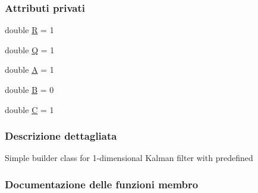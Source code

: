 \subsubsection*{Attributi privati}
\begin{DoxyCompactItemize}
\item 
double \hyperlink{classit_1_1unibo_1_1torsello_1_1bluetoothpositioning_1_1kalmanFilter_1_1KFBuilder_a7937e1ec71fbede97b0bd70ead2e30dd_a7937e1ec71fbede97b0bd70ead2e30dd}{R} = 1
\item 
double \hyperlink{classit_1_1unibo_1_1torsello_1_1bluetoothpositioning_1_1kalmanFilter_1_1KFBuilder_ad332fe3c9e6ec20badaa4b8738fe264b_ad332fe3c9e6ec20badaa4b8738fe264b}{Q} = 1
\item 
double \hyperlink{classit_1_1unibo_1_1torsello_1_1bluetoothpositioning_1_1kalmanFilter_1_1KFBuilder_a89f12916414e352fc820a2c82fde76b8_a89f12916414e352fc820a2c82fde76b8}{A} = 1
\item 
double \hyperlink{classit_1_1unibo_1_1torsello_1_1bluetoothpositioning_1_1kalmanFilter_1_1KFBuilder_a0659c3648f664458d627741edf1de5a4_a0659c3648f664458d627741edf1de5a4}{B} = 0
\item 
double \hyperlink{classit_1_1unibo_1_1torsello_1_1bluetoothpositioning_1_1kalmanFilter_1_1KFBuilder_aa35dc81cfdbcef5286f8c812f1849341_aa35dc81cfdbcef5286f8c812f1849341}{C} = 1
\end{DoxyCompactItemize}


\subsubsection{Descrizione dettagliata}
Simple builder class for 1-\/dimensional Kalman filter with predefined 

\subsubsection{Documentazione delle funzioni membro}
\hypertarget{classit_1_1unibo_1_1torsello_1_1bluetoothpositioning_1_1kalmanFilter_1_1KFBuilder_a6b994b0e818818c6da83ab5448caf6b0_a6b994b0e818818c6da83ab5448caf6b0}{}\label{classit_1_1unibo_1_1torsello_1_1bluetoothpositioning_1_1kalmanFilter_1_1KFBuilder_a6b994b0e818818c6da83ab5448caf6b0_a6b994b0e818818c6da83ab5448caf6b0} 
